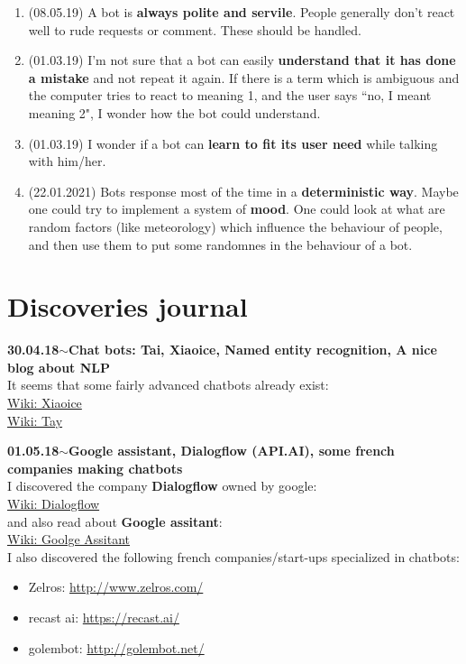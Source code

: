 \documentclass[11pt,a4paper]{article}
\newenvironment{loggentry}[2]%
{\noindent\textbf{#1}\hspace{1cm}$\mathbf{\sim}$\text{ }\textbf{#2}\\}{\vspace{0.5cm}}
\begin{document}
\begin{enumerate}
\item (08.05.19) A bot is \textbf{always polite and servile}. People generally don't react well to rude requests or comment. These should be handled.
\item (01.03.19) I'm not sure that a bot can easily \textbf{understand that it has done a mistake} and not repeat it again. If there is a term which is ambiguous and the computer tries to react to meaning 1, and the user says ``no, I meant meaning 2", I wonder how the bot could understand.
\item (01.03.19) I wonder if a bot can \textbf{learn to fit its user need} while talking with him/her.
\item (22.01.2021) Bots response most of the time in a \textbf{deterministic way}. Maybe one could try to implement a system of \textbf{mood}. One could look at what are random factors (like meteorology) which influence the behaviour of people, and then use them to put some randomnes in the behaviour of a bot.
\end{enumerate}




\section{Discoveries journal}

\begin{loggentry}{30.04.18}{Chat bots: Tai, Xiaoice, Named entity recognition, A nice blog about NLP}
It seems that some fairly advanced chatbots already exist:\\
\href{https://en.wikipedia.org/wiki/Xiaoice}{Wiki: Xiaoice}\\
\href{https://en.wikipedia.org/wiki/Tay_(bot)}{Wiki: Tay}\\
\end{loggentry}

\begin{loggentry}{01.05.18}{Google assistant, Dialogflow (API.AI), some french companies making chatbots}
I discovered the company \textbf{Dialogflow} owned by google:\\
\href{https://en.wikipedia.org/wiki/Dialogflow}{Wiki: Dialogflow}\\
and also read about \textbf{Google assitant}:\\
\href{https://en.wikipedia.org/wiki/Google_Assistant}{Wiki: Goolge Assitant}\\
I also discovered the following french companies/start-ups specialized in chatbots:\\
\begin{itemize}
\item Zelros: \url{http://www.zelros.com/}
\item recast ai: \url{https://recast.ai/}
\item golembot: \url{http://golembot.net/}
\end{itemize}
\end{loggentry}
\end{document}
